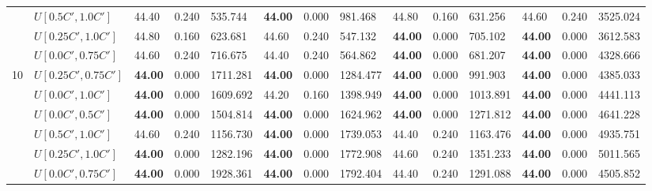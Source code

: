 \begin{table}[h]
{\begin{tabular}{|l|l||l|l|l||l|l|l||l|l|l||l|l|l|}
       & $U[0.5C',1.0C']$ & 44.40 & 0.240 & 535.744 & \textbf{44.00} & 0.000 & 981.468 	& 44.80 & 0.160 & 631.256 & 44.60 & 0.240 & 3525.024\\
       & $U[0.25C',1.0C']$ & 44.80 & 0.160 & 623.681 & 44.60 & 0.240 & 547.132 			& \textbf{44.00} & 0.000 & 705.102 & \textbf{44.00} & 0.000 & 3612.583\\
       & $U[0.0C',0.75C']$ & 44.60 & 0.240 & 716.675 & 44.40 & 0.240 & 564.862 			& \textbf{44.00} & 0.000 & 681.207 & \textbf{44.00} & 0.000 & 4328.666\\
      \hline\hline
      \multirow{6}{*}{10}
       & $U[0.25C',0.75C']$ & \textbf{44.00} & 0.000 & 1711.281 & \textbf{44.00} & 0.000 & 1284.477 	& \textbf{44.00} & 0.000 & 991.903 & \textbf{44.00} & 0.000 & 4385.033\\
       & $U[0.0C',1.0C']$ & \textbf{44.00} & 0.000 & 1609.692 & 44.20 & 0.160 & 1398.949 				& \textbf{44.00} & 0.000 & 1013.891 & \textbf{44.00} & 0.000 & 4441.113\\
       & $U[0.0C',0.5C']$ & \textbf{44.00} & 0.000 & 1504.814 & \textbf{44.00} & 0.000 & 1624.962	 & \textbf{44.00} & 0.000 & 1271.812 & \textbf{44.00} & 0.000 & 4641.228\\
       & $U[0.5C',1.0C']$ & 44.60 & 0.240 & 1156.730 & \textbf{44.00} & 0.000 & 1739.053 				& 44.40 & 0.240 & 1163.476 & \textbf{44.00} & 0.000 & 4935.751\\
       & $U[0.25C',1.0C']$ & \textbf{44.00} & 0.000 & 1282.196 & \textbf{44.00} & 0.000 & 1772.908  & 44.60 & 0.240 & 1351.233 & \textbf{44.00} & 0.000 & 5011.565\\
       & $U[0.0C',0.75C']$ & \textbf{44.00} & 0.000 & 1928.361 & \textbf{44.00} & 0.000 & 1792.404 & 44.40 & 0.240 & 1291.088 & \textbf{44.00} & 0.000 & 4505.852\\
      \hline
      \end{tabular}
      }
      \label{tab:in3}\end{table}


